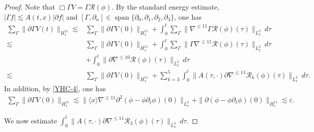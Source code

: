 \documentclass[11pt,twoside]{article}
\def\p{\partial}
\def\ve{\varepsilon}
\def\ls{\lesssim}
\newcommand{\w}[1]{\langle {#1} \rangle}
\theoremstyle{plain}
\theoremstyle{definition}
\theoremstyle{assumption}
\numberwithin{equation}{section}
\begin{document}
	\begin{proof}
		Note that $\Box\Gamma V=\Gamma\mathcal R(\phi)$.
		By the standard energy estimate, $|\Gamma f|\ls A(t,x)|\p f|$ and $[\Gamma,\p_\alpha]\in\operatorname{span}\{\p_0,\p_1,\p_2,\p_3\}$,
		one has
		\begin{equation}
			\label{eq:CVP-Gamma-V-energy-estimate}
			\begin{aligned}
				\sum_{\Gamma}
				\|\p\Gamma V(t)\|_{H^{11}_x}
				\ls
				&
				\sum_{\Gamma}
				\|\p\Gamma V(0)\|_{H^{11}_x}
				+
				\int_0^t
				\sum_{\Gamma}
				\|\nabla^{\le 11}\Gamma\mathcal R(\phi)(\tau)\|_{L^2_x}
				\,d\tau
				\\
				\ls
				&
				\sum_{\Gamma}
				\|\p\Gamma V(0)\|_{H^{11}_x}
				+
				\int_0^t
				\sum_{\Gamma}
				\|\Gamma\nabla^{\le 11}\mathcal R(\phi)(\tau)\|_{L^2_x}
				\,d\tau
				\\
				&+
				\int_0^t
				\|\p\nabla^{\le 10}\mathcal R(\phi)(\tau)\|_{L^2_x}
				\,d\tau
				\\
				\ls
				&
				\sum_{\Gamma}
				\|\p\Gamma V(0)\|_{H^{11}_x}
				+
				\sum_{k=3}^{5}\int_0^t
				\|A(\tau,\cdot)\p\nabla^{\le 11}\mathcal R_k(\phi)(\tau)\|_{L^2_x}
				\,d\tau .
			\end{aligned}
		\end{equation}
		In addition, by \eqref{YHC-4}, one has
		\begin{equation}
			\label{eq:CVP-Gamma-V-initial}
			\begin{aligned}
				\sum_{\Gamma}
				\|\p\Gamma V(0)\|_{H^{11}_x}
				\ls
				\|\w{x}\nabla^{\le 11}\p^2(\phi-\phi\p_t\phi)(0)\|_{L^{2}_x} + \|\p(\phi-\phi\p_t\phi)(0)\|_{H^{11}_x}
				\ls
				\ve.
			\end{aligned}
		\end{equation}
		
		
		We now estimate $ \int_0^t\|A(\tau,\cdot)\p\nabla^{\le 11}\mathcal R_3(\phi)(\tau)\|_{L^2_x}
		\,d\tau$.
		

\end{proof}
\end{document}
